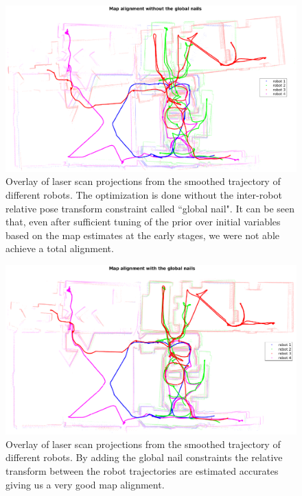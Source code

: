 \begin{figure}[H]
\centering
\includegraphics[width=\textwidth]{Chapters/figures6/without_map_alignment}
\caption{Overlay of laser scan projections from the smoothed trajectory of different robots. The optimization is done without the inter-robot relative pose transform constraint called ``global nail". It can be seen that, even after sufficient tuning of the prior over initial variables based on the map estimates at the early stages, we were not able achieve a total alignment.}
\label{fig:wo_align}
\end{figure}
\begin{figure}[H]
\centering
\includegraphics[width=\textwidth]{Chapters/figures6/with_map_alignment}
\caption{Overlay of laser scan projections from the smoothed trajectory of different robots. By adding the global nail constraints the relative transform between the robot trajectories are estimated accurates giving us a very good map alignment.}
\label{fig:w_align}
\end{figure}

